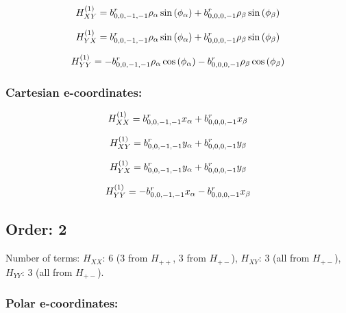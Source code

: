 \documentclass[fleqn]{article}
\begin{document}
\begin{dmath*}
H_{XY}^{(1)}= b^{r}_{0,0,-1,-1} \rho_{\alpha} \sin{\left (\phi_{\alpha} \right )} +  b^{r}_{0,0,0,-1} \rho_{\beta} \sin{\left (\phi_{\beta} \right )}\\
\end{dmath*}

\begin{dmath*}
H_{YX}^{(1)}= b^{r}_{0,0,-1,-1} \rho_{\alpha} \sin{\left (\phi_{\alpha} \right )} +  b^{r}_{0,0,0,-1} \rho_{\beta} \sin{\left (\phi_{\beta} \right )}\\
\end{dmath*}

\begin{dmath*}
H_{YY}^{(1)}=-  b^{r}_{0,0,-1,-1} \rho_{\alpha} \cos{\left (\phi_{\alpha} \right )} -  b^{r}_{0,0,0,-1} \rho_{\beta} \cos{\left (\phi_{\beta} \right )}\\
\end{dmath*}
\subsubsection*{Cartesian e-coordinates:}

\begin{dmath*}
H_{XX}^{(1)}=b^{r}_{0,0,-1,-1} x_{\alpha} + b^{r}_{0,0,0,-1} x_{\beta}\\
\end{dmath*}

\begin{dmath*}
H_{XY}^{(1)}= b^{r}_{0,0,-1,-1} y_{\alpha} +  b^{r}_{0,0,0,-1} y_{\beta}\\
\end{dmath*}

\begin{dmath*}
H_{YX}^{(1)}= b^{r}_{0,0,-1,-1} y_{\alpha} +  b^{r}_{0,0,0,-1} y_{\beta}\\
\end{dmath*}

\begin{dmath*}
H_{YY}^{(1)}=-  b^{r}_{0,0,-1,-1} x_{\alpha} -  b^{r}_{0,0,0,-1} x_{\beta}\\
\end{dmath*}
\subsection{Order: 2}
Number of terms: $H_{XX}$: $6$ ($3$ from $H_{++}$, $3$ from $H_{+-}$), $H_{XY}$: $3$ (all from $H_{+-}$), $H_{YY}$: $3$ (all from $H_{+-}$).
\subsubsection*{Polar e-coordinates:}
\end{document}
